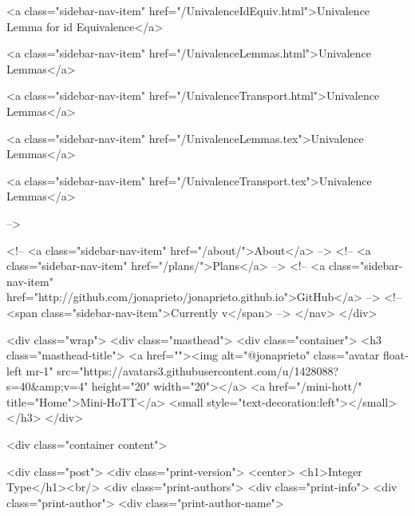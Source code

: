       
    
      
        
          <a class="sidebar-nav-item" href="/UnivalenceIdEquiv.html">Univalence Lemma for id Equivalence</a>
        
      
    
      
        
          <a class="sidebar-nav-item" href="/UnivalenceLemmas.html">Univalence Lemmas</a>
        
      
    
      
        
          <a class="sidebar-nav-item" href="/UnivalenceTransport.html">Univalence Lemmas</a>
        
      
    
      
        
          <a class="sidebar-nav-item" href="/UnivalenceLemmas.tex">Univalence Lemmas</a>
        
      
    
      
        
          <a class="sidebar-nav-item" href="/UnivalenceTransport.tex">Univalence Lemmas</a>
        
      
     -->

    <!-- <a class="sidebar-nav-item" href="/about/">About</a> -->
    <!-- <a class="sidebar-nav-item" href="/plans/">Plans</a> -->
    <!-- <a class="sidebar-nav-item" href="http://github.com/jonaprieto/jonaprieto.github.io">GitHub</a> -->
    <!-- <span class="sidebar-nav-item">Currently v</span> -->
  </nav>
</div>

    <div class="wrap">
      <div class="masthead">
        <div class="container">
          <h3 class="masthead-title">
            <a href=""><img alt="@jonaprieto" class="avatar float-left mr-1" src="https://avatars3.githubusercontent.com/u/1428088?s=40&amp;v=4" height="20" width="20"></a>
            <a href="/mini-hott/" title="Home">Mini-HoTT</a>
            <small style="text-decoration:left"></small>
          </h3>
        </div>
      
      <div class="container content">
        







<div class="post">
  <div class="print-version">
    <center>
      <h1>Integer Type</h1><br/>
        <div class="print-authors">
          <div class="print-info">
            <div class="print-author">
              <div class="print-author-name">
                
